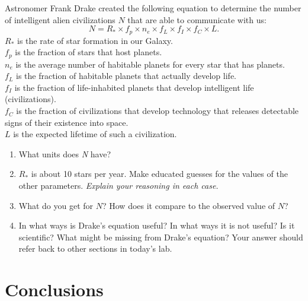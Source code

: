 \documentclass[12pt]{article}
\begin{document}
Astronomer Frank Drake created the following equation to determine the number of intelligent alien civilizations $N$ that are able to communicate with us:
$$ N = R_{*} \times f_{p} \times n_{e} \times f_{L} \times f_{I} \times f_{C} \times L. $$
$R_{*}$ is the rate of star formation in our Galaxy.
\\
$f_{p}$ is the fraction of stars that host planets.
\\
$n_{e}$ is the average number of habitable planets for every star that has planets.
\\
$f_{L}$ is the fraction of habitable planets that actually develop life.
\\
$f_{I}$ is the fraction of life-inhabited planets that develop intelligent life (civilizations).
\\
$f_{C}$ is the fraction of civilizations that develop technology that releases detectable signs of their existence into space.
\\
$L$ is the expected lifetime of such a civilization.

\begin{enumerate}

\item  What units does \emph{N} have?  

\item  $R_{*}$ is about 10 stars per year.  
Make educated guesses for the values of the other parameters.  \emph{Explain your reasoning in each case.}

\item  What do you get for $N$?  How does it compare to the observed value of $N$?

\item In what ways is Drake's equation useful?  
In what ways it is not useful?  Is it scientific?  
What might be missing from Drake's equation?  
Your answer should refer back to other sections in today's lab.

\end{enumerate}


\section{Conclusions}
\end{document}
